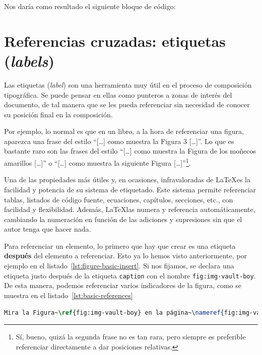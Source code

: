 Nos daría como resultado el siguiente bloque de código:
 


\section{Referencias cruzadas: etiquetas (\textit{labels})}

Las etiquetas (\textit{label}) son una herramienta muy útil en el proceso de composición tipográfica. Se puede pensar en ellas como punteros a zonas de interés del documento, de tal manera que se les pueda referenciar sin necesidad de conocer su posición final en la composición.

Por ejemplo, lo normal es que en un libro, a la hora de referenciar una figura, aparezca una frase del estilo ``[\ldots] como muestra la Figura 3 [\ldots]''. Lo que es bastante raro son las frases del estilo ``[\ldots] como muestra la Figura de los moñecos amarillos [\ldots]'' o ``[\ldots] como muestra la siguiente Figura [\ldots]''\footnote{Sí, bueno, quizá la segunda frase no es tan rara, pero siempre es preferible referenciar directamente a dar posiciones relativas.}.

Una de las propiedades más útiles y, en ocasiones, infravaloradas de \LaTeX es la facilidad y potencia de su sistema de etiquetado. Este sistema permite referenciar tablas, listados de código fuente, ecuaciones, capítulos, secciones, etc., con facilidad y flexibilidad. Además, \LaTeX las numera y referencia automáticamente, cambiando la numeración en función de las adiciones y supresiones sin que el autor tenga que hacer nada.

Para referenciar un elemento, lo primero que hay que crear es una etiqueta \textbf{después} del elemento a referenciar. Esto ya lo hemos visto anteriormente, por ejemplo en el listado~\ref{lst:figure-basic-insert}. Si nos fijamos, se declara una etiqueta justo después de la etiqueta \texttt{caption} con el nombre \texttt{fig:img-vault-boy}. De esta manera, podemos referenciar varios indicadores de la figura, como se muestra en el listado~\ref{lst:basic-references}

\begin{lstlisting}[language=tex, caption=Referenciando una figura y su página,label={lst:basic-references},]
Mira la Figura~\ref{fig:img-vault-boy} en la página~\nameref{fig:img-vault-boy}.
\end{lstlisting}

